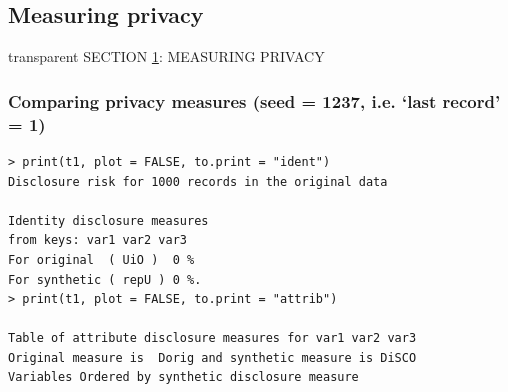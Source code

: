 \documentclass[t,8pt,utfx8]{beamer}
\begin{document}
\begin{spacing}{1.25}
{}


\section{Measuring privacy}\label{sec:privacy}
\begin{frame}[c,plain]
\vskip-4mm
\begin{beamercolorbox}[wd=\boxwidth,ht=22.11mm]{transparent}%
    \vfill%
    \leftinsert%
    \MakeUppercase{Section \ref{sec:privacy}: Measuring privacy
} %
\end{beamercolorbox}
\vskip-3mm

\end{frame}



\begin{frame}[fragile]
\frametitle{Comparing privacy measures (seed = 1237, i.e. `last record' = 1)}
  


\begin{minipage}[t]{0.48\textwidth}
\begin{lstlisting}
> print(t1, plot = FALSE, to.print = "ident")
Disclosure risk for 1000 records in the original data

Identity disclosure measures
from keys: var1 var2 var3 
For original  ( UiO )  0 %
For synthetic ( repU ) 0 %.
> print(t1, plot = FALSE, to.print = "attrib")

Table of attribute disclosure measures for var1 var2 var3 
Original measure is  Dorig and synthetic measure is DiSCO 
Variables Ordered by synthetic disclosure measure


\end{lstlisting}
\end{minipage}
\end{frame}
\end{spacing}
\end{document}
